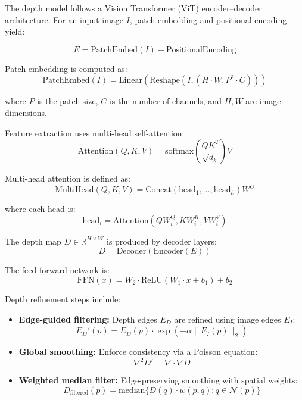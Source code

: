 \documentclass[12pt]{article}
\begin{document}
The depth model follows a Vision Transformer (ViT) encoder--decoder architecture. For an input image \(I\), patch embedding and positional encoding yield:

\[ E = \text{PatchEmbed}(I) + \text{PositionalEncoding} \]

Patch embedding is computed as:
\[ \text{PatchEmbed}(I) = \text{Linear}(\text{Reshape}(I, (H \cdot W, P^2 \cdot C))) \]

where \(P\) is the patch size, \(C\) is the number of channels, and \(H,W\) are image dimensions.

Feature extraction uses multi-head self-attention:
\[ \text{Attention}(Q,K,V) = \text{softmax}\left(\frac{QK^T}{\sqrt{d_k}}\right)V \]

Multi-head attention is defined as:
\[ \text{MultiHead}(Q,K,V) = \text{Concat}(\text{head}_1, \ldots, \text{head}_h)W^O \]

where each head is:
\[ \text{head}_i = \text{Attention}(QW_i^Q, KW_i^K, VW_i^V) \]

The depth map \(D \in \mathbb{R}^{H \times W}\) is produced by decoder layers:
\[ D = \text{Decoder}(\text{Encoder}(E)) \]

The feed-forward network is:
\[ \text{FFN}(x) = W_2 \cdot \text{ReLU}(W_1 \cdot x + b_1) + b_2 \]

Depth refinement steps include:
\begin{itemize}
\item \textbf{Edge-guided filtering:} Depth edges \(E_D\) are refined using image edges \(E_I\):
\[ E_D'(p) = E_D(p) \cdot \exp(-\alpha \|E_I(p)\|_2) \]

\item \textbf{Global smoothing:} Enforce consistency via a Poisson equation:
\[ \nabla^2 D' = \nabla \cdot \nabla D \]

\item \textbf{Weighted median filter:} Edge-preserving smoothing with spatial weights:
\[ D_{\text{filtered}}(p) = \text{median}\{D(q) \cdot w(p,q) : q \in \mathcal{N}(p)\} \]
\end{itemize}
\end{document}
